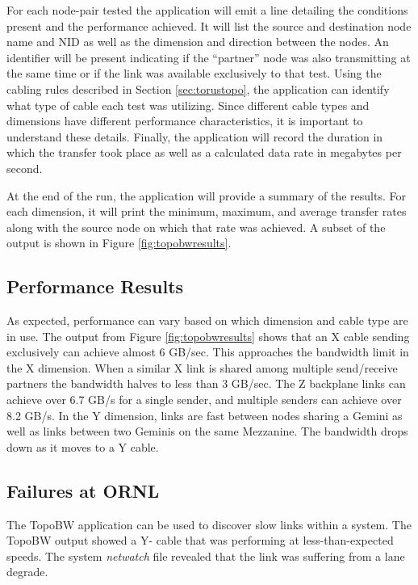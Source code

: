 \documentclass[10pt, conference, compsocconf]{IEEEtran}
\begin{document}
For each node-pair tested the application will emit a line detailing the
conditions present and the performance achieved.  It will list the source and
destination node name and NID as well as the dimension and direction between
the nodes.  An identifier will be present indicating if the ``partner'' node
was also transmitting at the same time or if the link was available exclusively
to that test.  Using the cabling rules described in Section
\ref{sec:torustopo}, the application can identify what type of cable each test
was utilizing.  Since different cable types and dimensions have different
performance characteristics, it is important to understand these details.
Finally, the application will record the duration in which the transfer took
place as well as a calculated data rate in megabytes per second.

At the end of the run, the application will provide a summary of the results.
For each dimension, it will print the minimum, maximum, and average transfer
rates along with the source node on which that rate was achieved.  A subset of
the output is shown in Figure \ref{fig:topobwresults}.


\subsection{Performance Results}

As expected, performance can vary based on which dimension and cable type are
in use.  The output from Figure \ref{fig:topobwresults} shows that an X cable
sending exclusively can achieve almost 6 GB/sec.  This approaches the bandwidth
limit in the X dimension.  When a similar X link is shared among multiple
send/receive partners the bandwidth halves to less than 3 GB/sec.  The Z
backplane links can achieve over 6.7 GB/s for a single sender, and multiple
senders can achieve over 8.2 GB/s.  In the Y dimension, links are fast between
nodes sharing a Gemini as well as links between two Geminis on the same
Mezzanine.  The bandwidth drops down as it moves to a Y cable.

\subsection{Failures at ORNL}

The TopoBW application can be used to discover slow links within a system.  The
TopoBW output showed a Y- cable that was performing at less-than-expected
speeds.  The system \emph{netwatch} file revealed that the link was suffering
from a lane degrade.
\end{document}
